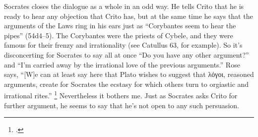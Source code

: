 \documentclass[12pt,letterpaper]{article}
\begin{document}
Socrates closes the dialogue as a whole in an odd way.
He tells Crito that he is ready to hear any objection that Crito has, but at the same time he says that the arguments of the Laws ring in his ears just as ``Corybantes seem to hear the pipes'' (54d4--5).
The Corybantes were the priests of Cybele, and they were famous for their frenzy and irrationality (see Catullus 63, for example).
So it's disconcerting for Socrates to say all at once ``Do you have any other argument?'' and ``I'm carried away by the irrational love of the previous arguments.''
Rose says, ``[W]e can at least say here that Plato wishes to suggest that \textgreek{λόγοι}, reasoned arguments, create for Socrates the ecstasy for which others turn to orgiastic and irrational rites.''%
\footcite[][40]{rose-crito-1983}
Nevertheless it bothers me.
Just as Socrates asks Crito for further argument, he seems to say that he's not open to any such persuasion.

\newpage
\pagestyle{references}
\nocite{burnet1903}
\printbibliography[filter=sources,title={Ancient Sources: Editions, Translations, Commentaries}]
\printbibliography[filter=secondary,title=Secondary Literature]
\end{document}
